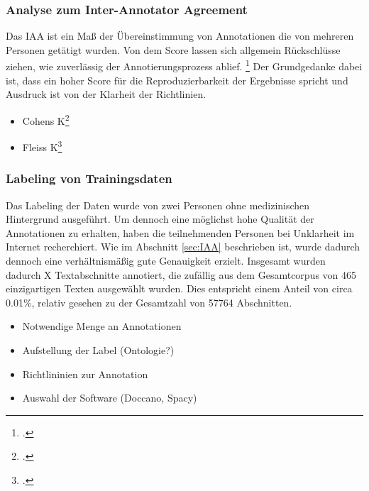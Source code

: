 \subsubsection{Analyse zum Inter-Annotator Agreement}\label{sec:Iaa}
Das \acf*{IAA} ist ein Maß der Übereinstimmung von Annotationen die von mehreren Personen getätigt wurden. Von dem Score lassen sich allgemein Rückschlüsse ziehen, wie zuverlässig der Annotierungsprozess ablief. \footcite[vgl.][S.298]{ide2017} Der Grundgedanke dabei ist, dass ein hoher Score für die Reproduzierbarkeit der Ergebnisse spricht und Ausdruck ist von der Klarheit der Richtlinien.

\begin{itemize}
    \item Cohens K\footcite[vgl.][S.]{cohen1960}
    \item Fleiss K\footcite[vgl.][S.]{fleiss1971}
\end{itemize}

\subsubsection{Labeling von Trainingsdaten}\label{sec:Labeling}
Das Labeling der Daten wurde von zwei Personen ohne medizinischen Hintergrund ausgeführt. Um dennoch eine möglichst hohe Qualität der Annotationen zu erhalten, haben die teilnehmenden Personen bei Unklarheit im Internet recherchiert. Wie im Abschnitt \ref{sec:IAA} beschrieben ist, wurde dadurch dennoch eine verhältnismäßig gute Genauigkeit erzielt.
Insgesamt wurden dadurch X Textabschnitte annotiert, die zufällig aus dem Gesamtcorpus von 465 einzigartigen Texten ausgewählt wurden. Dies entspricht einem Anteil von circa 0.01\%, relativ gesehen zu der Gesamtzahl von 57764 Abschnitten.


\begin{itemize}
    \item Notwendige Menge an Annotationen
    \item Aufstellung der Label (Ontologie?)
    \item Richtlininien zur Annotation
    \item Auswahl der Software (Doccano, Spacy)
\end{itemize}
